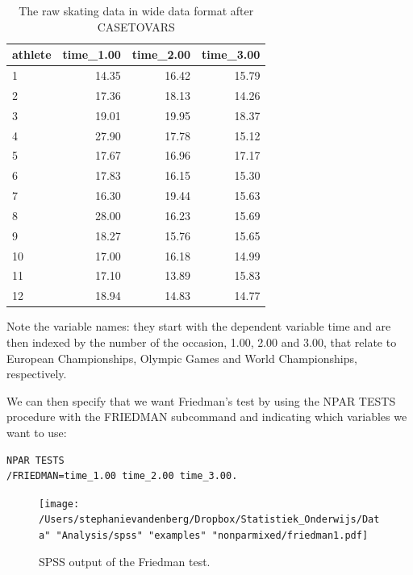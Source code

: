\documentclass[]{book}\usepackage[]{graphicx}\usepackage[]{color}
\begin{document}
\begin{table}[ht]
\centering
\caption{The raw skating data in wide data format after CASETOVARS} 
\label{tab:nonparmixed_7}
\begin{tabular}{lrrr}
  \hline
athlete & time\_1.00 & time\_2.00 & time\_3.00 \\ 
  \hline
1 & 14.35 & 16.42 & 15.79 \\ 
  2 & 17.36 & 18.13 & 14.26 \\ 
  3 & 19.01 & 19.95 & 18.37 \\ 
  4 & 27.90 & 17.78 & 15.12 \\ 
  5 & 17.67 & 16.96 & 17.17 \\ 
  6 & 17.83 & 16.15 & 15.30 \\ 
  7 & 16.30 & 19.44 & 15.63 \\ 
  8 & 28.00 & 16.23 & 15.69 \\ 
  9 & 18.27 & 15.76 & 15.65 \\ 
  10 & 17.00 & 16.18 & 14.99 \\ 
  11 & 17.10 & 13.89 & 15.83 \\ 
  12 & 18.94 & 14.83 & 14.77 \\ 
   \hline
\end{tabular}
\end{table}


Note the variable names: they start with the dependent variable time and are then indexed by the number of the occasion, 1.00, 2.00 and 3.00, that relate to European Championships, Olympic Games and World Championships, respectively.

We can then specify that we want Friedman's test by using the NPAR TESTS procedure with the FRIEDMAN subcommand and indicating which variables we want to use:

\begin{verbatim}
NPAR TESTS
/FRIEDMAN=time_1.00 time_2.00 time_3.00.
\end{verbatim}

\begin{figure}[h]
    \begin{center}
       \texttt{[image: /Users/stephanievandenberg/Dropbox/Statistiek\_Onderwijs/Data" "Analysis/spss" "examples" "nonparmixed/friedman1.pdf]}
    \end{center}
     \caption{SPSS output of the Friedman test.}
    \label{fig:friedman1}
\end{figure}
\end{document}

